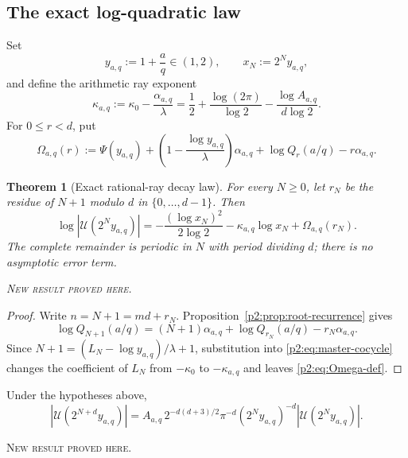 \documentclass[11pt,oneside]{article}
\newtheorem{theorem}{Theorem}[section]
\theoremstyle{definition}
\theoremstyle{remark}
\newcommand{\newresult}{\textcolor{newgreen}{\textsc{New result proved here.}}}
\begin{document}
\subsection{The exact log-quadratic law}

Set
\begin{equation}
 y_{a,q}:=1+\frac aq\in(1,2),\qquad x_N:=2^Ny_{a,q},
 \label{p2:eq:rational-ray}
\end{equation}
and define the arithmetic ray exponent
\begin{equation}
 \boxed{
 \kappa_{a,q}:=\kappa_0-\frac{\alpha_{a,q}}{\lambda}
 =\frac12+\frac{\log(2\pi)}{\log2}
 -\frac{\log A_{a,q}}{d\log2}.}
 \label{p2:eq:kappa-aq}
\end{equation}
For $0\le r<d$, put
\begin{equation}
 \Omega_{a,q}(r):=\Psi(y_{a,q})
 +\left(1-\frac{\log y_{a,q}}{\lambda}\right)\alpha_{a,q}
 +\log Q_r(a/q)-r\alpha_{a,q}.
 \label{p2:eq:Omega-def}
\end{equation}

\begin{theorem}[Exact rational-ray decay law]\label{p2:thm:exact-rational-ray}
For every $N\ge0$, let $r_N$ be the residue of $N+1$ modulo $d$ in
$\{0,\ldots,d-1\}$. Then
\begin{equation}
 \boxed{
 \log|\mathscr U(2^Ny_{a,q})|
 =-\frac{(\log x_N)^2}{2\log2}
 -\kappa_{a,q}\log x_N+\Omega_{a,q}(r_N).}
 \label{p2:eq:exact-ray-law}
\end{equation}
The complete remainder is periodic in $N$ with period dividing $d$; there is no
asymptotic error term.

\smallskip\noindent\newresult
\end{theorem}

\begin{proof}
Write $n=N+1=md+r_N$. Proposition~\ref{p2:prop:root-recurrence} gives
\[
 \log Q_{N+1}(a/q)
 =(N+1)\alpha_{a,q}+
 \log Q_{r_N}(a/q)-r_N\alpha_{a,q}.
\]
Since $N+1=(L_N-\log y_{a,q})/\lambda+1$, substitution into
\eqref{p2:eq:master-cocycle} changes the coefficient of $L_N$ from $-\kappa_0$ to
$-\kappa_{a,q}$ and leaves \eqref{p2:eq:Omega-def}.
\end{proof}

\begin{corollary}\label{p2:cor:d-step-ray}
Under the hypotheses above,
\begin{equation}
 \boxed{
 |\mathscr U(2^{N+d}y_{a,q})|
 =A_{a,q}\,2^{-d(d+3)/2}\pi^{-d}(2^Ny_{a,q})^{-d}
 |\mathscr U(2^Ny_{a,q})|.}
 \label{p2:eq:d-step-ray}
\end{equation}

\smallskip\noindent\newresult
\end{corollary}
\end{document}
